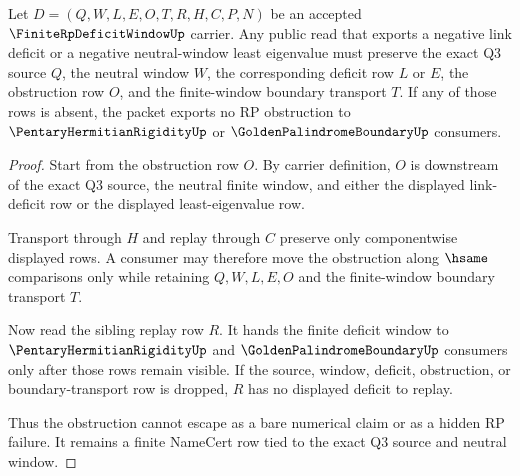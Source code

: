 \begin{theorem}
\label{thm:finite-rp-deficit-window-obstruction-transport}
Let $D=(Q,W,L,E,O,T,R,H,C,P,N)$ be an accepted $\FiniteRpDeficitWindowUp$ carrier. Any public read that exports a negative link deficit or a negative neutral-window least eigenvalue must preserve the exact Q3 source $Q$, the neutral window $W$, the corresponding deficit row $L$ or $E$, the obstruction row $O$, and the finite-window boundary transport $T$. If any of those rows is absent, the packet exports no RP obstruction to $\PentaryHermitianRigidityUp$ or $\GoldenPalindromeBoundaryUp$ consumers.
\end{theorem}
\begin{proof}
Start from the obstruction row $O$. By carrier definition, $O$ is downstream of the exact Q3 source, the neutral finite window, and either the displayed link-deficit row or the displayed least-eigenvalue row.

Transport through $H$ and replay through $C$ preserve only componentwise displayed rows. A consumer may therefore move the obstruction along $\hsame$ comparisons only while retaining $Q,W,L,E,O$ and the finite-window boundary transport $T$.

Now read the sibling replay row $R$. It hands the finite deficit window to $\PentaryHermitianRigidityUp$ and $\GoldenPalindromeBoundaryUp$ consumers only after those rows remain visible. If the source, window, deficit, obstruction, or boundary-transport row is dropped, $R$ has no displayed deficit to replay.

Thus the obstruction cannot escape as a bare numerical claim or as a hidden RP failure. It remains a finite NameCert row tied to the exact Q3 source and neutral window.
\end{proof}



